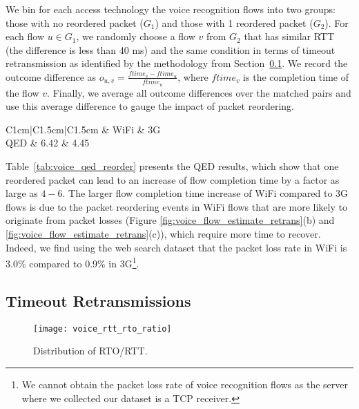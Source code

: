 We bin for each access technology the voice recognition flows into two groups: those with no reordered packet ($G_1$) and those with 1 reordered packet ($G_2$). For each flow $u \in G_1$, we randomly choose a flow $v$ from $G_2$ that has similar RTT (\ie the difference is less than 40 ms) and the same condition in terms of timeout retransmission as identified by the methodology from Section~\ref{sec:v_rto}. We record the outcome difference as $o_{u,v} = \frac{ftime_{v} - ftime_{u}}{ftime_{u}}$, where $ftime_v$ is the completion time of the flow $v$. Finally, we average all outcome differences over the matched pairs and use this average difference to gauge the impact of packet reordering.

\begin{table}[th]
\caption{QED results for the impact of packet reordering.}
\label{tab:voice_qed_reorder}
\centering
\renewcommand{\arraystretch}{1}
\begin{tabular}{C{1cm}|C{1.5cm}|C{1.5cm}}
	\hline
	 & WiFi & 3G \\
	\hline
	QED & 6.42 & 4.45 \\
	\hline
\end{tabular}
\minsqueeze
\end{table}

Table~\ref{tab:voice_qed_reorder} presents the QED results, which show that one reordered packet can lead to an increase of flow completion time by a factor as large as $4-6$. The larger flow completion time increase of WiFi compared to 3G flows is due to the packet reordering events in WiFi flows that are more likely to originate from packet losses (\ie Figure \ref{fig:voice_flow_estimate_retrans}(b) and \ref{fig:voice_flow_estimate_retrans}(c)), which require more time to recover. Indeed, we find using the web search dataset that the packet loss rate in WiFi is 3.0\% compared to 0.9\% in 3G\footnote{We cannot obtain the packet loss rate of voice recognition flows as the server where we collected our dataset is a TCP receiver.}. 

\subsection{Timeout Retransmissions}\label{sec:v_rto}

\begin{figure}[th]
\centering
	\texttt{[image: voice\_rtt\_rto\_ratio]}
\caption{Distribution of RTO/RTT.}
\label{fig:rto_rtt}
\minsqueeze
\end{figure}

